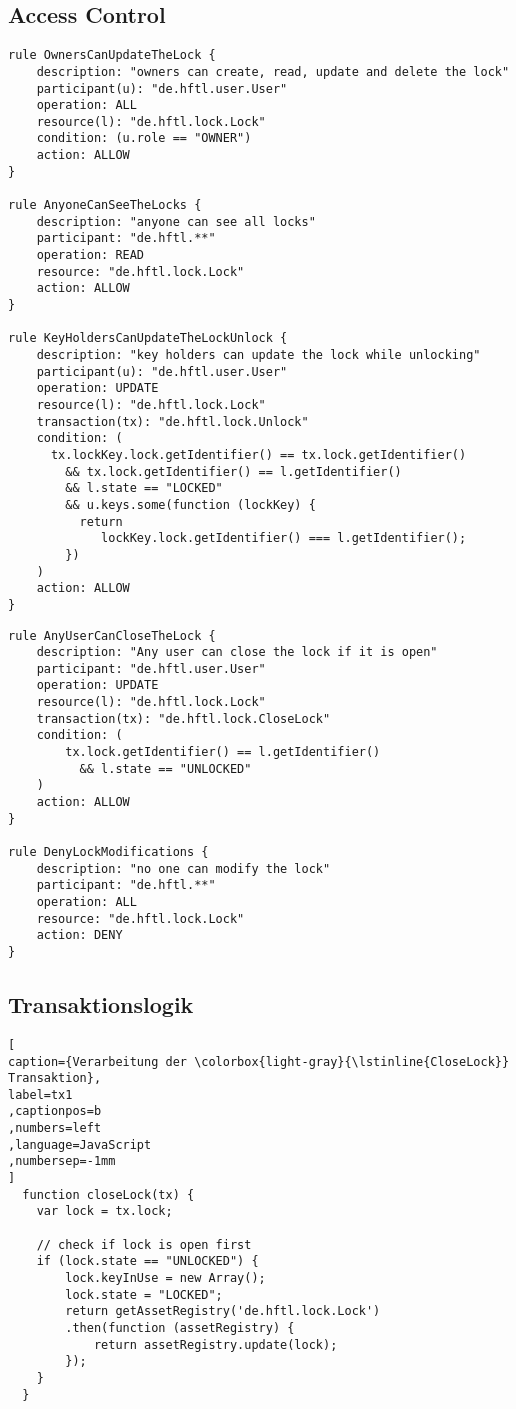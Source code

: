     \subsection{Access Control}
    \begin{lstlisting}[caption={Beispiel der Access Control Rules für ein Schloss},label=acl1,captionpos=b]
rule OwnersCanUpdateTheLock {
    description: "owners can create, read, update and delete the lock"
    participant(u): "de.hftl.user.User"
    operation: ALL
    resource(l): "de.hftl.lock.Lock"
    condition: (u.role == "OWNER")
    action: ALLOW
}

rule AnyoneCanSeeTheLocks {
    description: "anyone can see all locks"
    participant: "de.hftl.**"
    operation: READ
    resource: "de.hftl.lock.Lock"
    action: ALLOW
}

rule KeyHoldersCanUpdateTheLockUnlock {
    description: "key holders can update the lock while unlocking"
    participant(u): "de.hftl.user.User"
    operation: UPDATE
    resource(l): "de.hftl.lock.Lock"
    transaction(tx): "de.hftl.lock.Unlock"
    condition: (
      tx.lockKey.lock.getIdentifier() == tx.lock.getIdentifier()
        && tx.lock.getIdentifier() == l.getIdentifier()
        && l.state == "LOCKED"
        && u.keys.some(function (lockKey) {
          return 
             lockKey.lock.getIdentifier() === l.getIdentifier();
        })
    )
    action: ALLOW
}
\end{lstlisting}
\newpage
\begin{lstlisting}[caption={Beispiel der Access Control Rules für ein Schloss (fortgesetzt)},label=acl2,captionpos=b]
rule AnyUserCanCloseTheLock {
    description: "Any user can close the lock if it is open"
    participant: "de.hftl.user.User"
    operation: UPDATE
    resource(l): "de.hftl.lock.Lock"
    transaction(tx): "de.hftl.lock.CloseLock"
    condition: (
        tx.lock.getIdentifier() == l.getIdentifier()
          && l.state == "UNLOCKED"
    )
    action: ALLOW
}

rule DenyLockModifications {
    description: "no one can modify the lock"
    participant: "de.hftl.**"
    operation: ALL
    resource: "de.hftl.lock.Lock"
    action: DENY
}
    \end{lstlisting}
    
    \newpage
    \subsection{Transaktionslogik}
\begin{lstlisting}[
caption={Verarbeitung der \colorbox{light-gray}{\lstinline{CloseLock}} Transaktion},
label=tx1
,captionpos=b
,numbers=left
,language=JavaScript
,numbersep=-1mm
]
  function closeLock(tx) {
	var lock = tx.lock;
	
	// check if lock is open first
	if (lock.state == "UNLOCKED") {
		lock.keyInUse = new Array();
		lock.state = "LOCKED";
		return getAssetRegistry('de.hftl.lock.Lock')
		.then(function (assetRegistry) {
			return assetRegistry.update(lock);
  		});
  	}
  }
\end{lstlisting}

